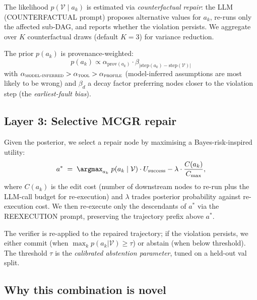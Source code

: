 The likelihood $p(\mathcal{V} \mid a_k)$ is estimated via
\emph{counterfactual repair}: the LLM (\textsc{COUNTERFACTUAL} prompt)
proposes alternative values for $a_k$, re-runs only the affected
sub-DAG, and reports whether the violation persists. We aggregate over
$K$ counterfactual draws (default $K=3$) for variance reduction.

The prior $p(a_k)$ is provenance-weighted:
\begin{equation}
p(a_k) \propto \alpha_{\mathrm{prov}(a_k)} \cdot \beta_{|\mathrm{step}(a_k) - \mathrm{step}(\mathcal{V})|}
\end{equation}
with $\alpha_{\textsc{model-inferred}} > \alpha_{\textsc{tool}} > \alpha_{\textsc{profile}}$
(model-inferred assumptions are most likely to be wrong) and
$\beta_d$ a decay factor preferring nodes closer to the violation
step (the \emph{earliest-fault bias}).

\subsection{Layer 3: Selective MCGR repair}
\label{sec:layer3}

Given the posterior, we select a repair node by maximising a
Bayes-risk-inspired utility:
\begin{equation}
a^* \;=\; \argmax_{a_k}\; p(a_k \mid \mathcal{V}) \cdot U_{\mathrm{success}} - \lambda \cdot \frac{C(a_k)}{C_{\max}},
\label{eq:mcgr}
\end{equation}
where $C(a_k)$ is the edit cost (number of downstream nodes to re-run
plus the LLM-call budget for re-execution) and $\lambda$ trades
posterior probability against re-execution cost. We then re-execute
only the descendants of $a^*$ via the \textsc{REEXECUTION} prompt,
preserving the trajectory prefix above $a^*$.

The verifier is re-applied to the repaired trajectory; if the violation
persists, we either commit (when $\max_k p(a_k|\mathcal{V}) \geq \tau$)
or abstain (when below threshold). The threshold $\tau$ is the
\emph{calibrated abstention parameter}, tuned on a held-out val split.

\subsection{Why this combination is novel}
\label{sec:joint}

